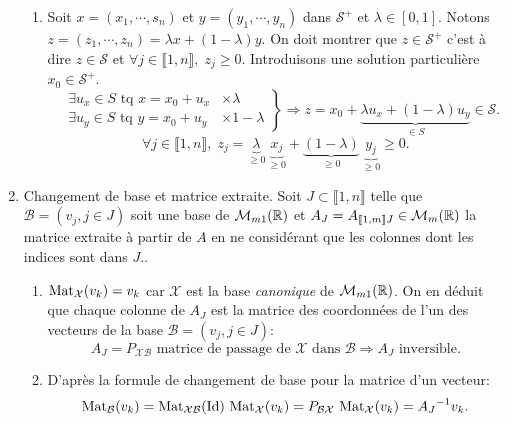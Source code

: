 \begin{enumerate}
\begin{enumerate}
    \item Soit $x=(x_1, \cdots, s_n)$ et $y=(y_1,\cdots,y_n)$ dans $\mathcal{S}^+$ et $\lambda \in [0,1]$. Notons $z=(z_1,\cdots, z_n) = \lambda x + (1-\lambda)y$. On doit montrer que $z \in \mathcal{S}^+$ c'est à dire $z \in \mathcal{S}$ et $\forall j \in \llbracket 1,n \rrbracket,\; z_j \geq 0$.\newline
Introduisons une solution particulière $x_0 \in \mathcal{S}^+$.
\[
\left.
  \begin{aligned}
    &\exists u_x \in S \text{ tq } x = x_0 + u_x &\times \lambda\\ 
    &\exists u_y \in S \text{ tq } y = x_0 + u_y &\times 1-\lambda
  \end{aligned}
\right\rbrace \Rightarrow 
z = x_0 + \underset{\in S}{\underbrace{\lambda u_x + (1-\lambda)u_y}}
\in \mathcal{S}.
\]
\[
  \forall j \in \llbracket 1,n \rrbracket,\; z_j = \underset{\geq 0}{\underbrace{\lambda}} \,\underset{\geq 0}{\underbrace{x_j}}
  + \underset{\geq 0}{\underbrace{(1-\lambda)}} \,\underset{\geq 0}{\underbrace{y_j}} \geq 0.
\]
  \end{enumerate}

  \item Changement de base et matrice extraite.\newline
Soit $J \subset \llbracket 1, n \rrbracket$ telle que $\mathcal{B} = \left(v_j , j\in J \right)$ soit une base de $\mathcal{M}_{m 1 }(\mathbb{R})$ et $A_J = A_{\llbracket 1,m\rrbracket J} \in \mathcal{M}_m(\mathbb{R})$ la matrice extraite à partir de $A$ en ne considérant que les colonnes dont les indices sont dans $J$..
  \begin{enumerate}
    \item $\operatorname{Mat}_{\mathcal{X}}(v_k) = v_k$ car $\mathcal{X}$ est la base \emph{canonique} de $\mathcal{M}_{m 1}(\mathbb{R})$. On en déduit que chaque colonne de $A_J$ est la matrice des coordonnées de l'un des vecteurs de la base $\mathcal{B} = \left(v_j , j\in J \right)$: 
\[
  A_J = P_{\mathcal{X} \mathcal{B}} \text{ matrice de passage de } \mathcal{X} \text{ dans } \mathcal{B}
  \Rightarrow A_J \text{ inversible}.
\]

    \item D'après la formule de changement de base pour la matrice d'un vecteur:
\[
  \operatorname{Mat}_{\mathcal{B}}(v_k) = \operatorname{Mat}_{\mathcal{X} \mathcal{B}}(\operatorname{Id})\,\operatorname{Mat}_{\mathcal{X}}(v_k) 
  = P_{\mathcal{B} \mathcal{X}}\, \operatorname{Mat}_{\mathcal{X}}(v_k)
  = {A_J}^{-1} v_k.
\]

  \end{enumerate}
\end{enumerate}

